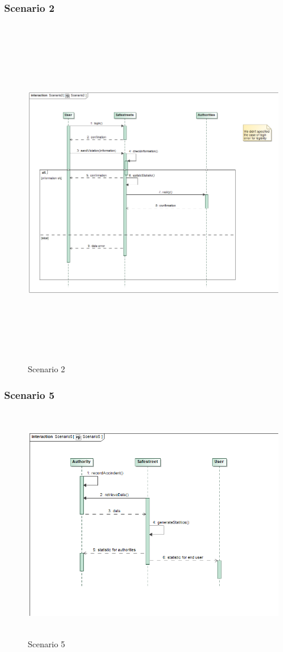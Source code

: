 \subsubsection{Scenario 2}
	\begin{figure}[H]
	\begin{minipage}[b]{0.40\textwidth}
		\includegraphics[width=18cm,height=15cm]{Images/SequenceRASD/Scenario2.png}
		\caption{Scenario 2}
	\end{minipage}
\end{figure}
\newpage
\subsubsection{Scenario 5}
\begin{figure}[H]
	\begin{minipage}[b]{0.40\textwidth}
		\includegraphics[width=15cm,height=10cm]{Images/SequenceRASD/Scenario5.png}
		\caption{Scenario 5}
	\end{minipage}
\end{figure}
\newpage
